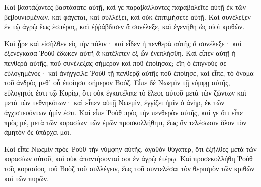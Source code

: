 {Καὶ βαστάζοντες βαστάσατε αὐτῇ, καί γε παραβάλλοντες παραβαλεῖτε αὐτῇ ἐκ τῶν βεβουνισμένων, καὶ φάγεται, καὶ συλλέξει, καὶ οὐκ ἐπιτιμήσετε αὐτῇ.
Καὶ συνέλεξεν ἐν τῷ ἀγρῷ ἕως ἑσπέρας, καὶ ἐῤῥάβδισεν ἃ συνέλεξε, καὶ ἐγενήθη ὡς οἰφὶ κριθῶν.
\par }{\PP {}Καὶ ᾖρε καὶ εἰσῆλθεν εἰς τὴν πόλιν· καὶ εἶδεν ἡ πενθερὰ αὐτῆς ἃ συνέλεξε· καὶ ἐξενέγκασα Ῥοὺθ ἔδωκεν αὐτῇ ἃ κατέλιπεν ἐξ ὧν ἐνεπλήσθη.
Καὶ εἶπεν αὐτῇ ἡ πενθερὰ αὐτῆς, ποῦ συνέλεξας σήμερον καὶ ποῦ ἐποίησας; εἴη ὁ ἐπιγνούς σε εὐλογημένος· καὶ ἀνήγγειλε Ῥοὺθ τῇ πενθερᾷ αὐτῆς ποῦ ἐποίησε, καὶ εἶπε, τὸ ὄνομα τοῦ ἀνδρὸς μεθʼ οὗ ἐποίησα σήμερον Βοόζ.
Εἶπε δὲ Νωεμὶν τῇ νύμφῃ αὐτῆς, εὐλογητός ἐστι τῷ Κυρίῳ, ὅτι οὐκ ἐγκατέλιπε τὸ ἔλεος αὐτοῦ μετὰ τῶν ζώντων καὶ μετὰ τῶν τεθνηκότων· καὶ εἶπεν αὐτῇ Νωεμὶν, ἐγγίζει ἡμῖν ὁ ἀνὴρ, ἐκ τῶν ἀγχιστευόντων ἡμῖν ἐστι.
Καὶ εἶπε Ῥοὺθ πρὸς τὴν πενθερὰν αὐτῆς, καί γε ὅτι εἶπε πρὸς μέ, μετὰ τῶν κορασίων τῶν ἐμῶν προσκολλήθητι, ἕως ἂν τελέσωσιν ὅλον τὸν ἀμητὸν ὃς ὑπάρχει μοι.
\par }{\PP {}Καὶ εἶπε Νωεμὶν πρὸς Ῥοὺθ τὴν νύμφην αὐτῆς, ἀγαθὸν θύγατερ, ὅτι ἐξῆλθες μετὰ τῶν κορασίων αὐτοῦ, καὶ οὐκ ἀπαντήσονταί σοι ἐν ἀγρῷ ἑτέρῳ.
Καὶ προσεκολλήθη Ῥοὺθ τοῖς κορασίοις τοῦ Βοὸζ τοῦ συλλέγειν, ἕως τοῦ συντελέσαι τὸν θερισμὸν τῶν κριθῶν καὶ τῶν πυρῶν.

}
